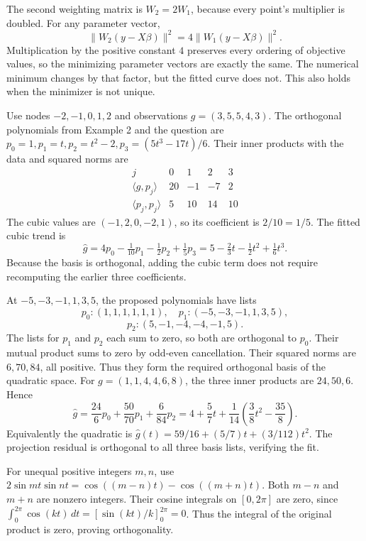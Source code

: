 The second weighting matrix is $W_2=2W_1$, because every point's
multiplier is doubled. For any parameter vector,
\[
 \|W_2(y-X\beta)\|^2=4\|W_1(y-X\beta)\|^2.
\]
Multiplication by the positive constant $4$ preserves every ordering
of objective values, so the minimizing parameter vectors are exactly
the same. The numerical minimum changes by that factor, but the
fitted curve does not. This also holds when the minimizer is not unique.

Use nodes $-2,-1,0,1,2$ and observations $g=(3,5,5,4,3)$.
The orthogonal polynomials from Example 2 and the question are
$p_0=1,p_1=t,p_2=t^2-2,p_3=(5t^3-17t)/6$.
Their inner products with the data and squared norms are
\[
\begin{array}{c|rrrr}
 j&0&1&2&3\\\hline
 \langle g,p_j\rangle&20&-1&-7&2\\
 \langle p_j,p_j\rangle&5&10&14&10
\end{array}
\]
The cubic values are $(-1,2,0,-2,1)$, so its coefficient is
$2/10=1/5$. The fitted cubic trend is
\[
 \widehat g=4p_0-\tfrac1{10}p_1-\tfrac12p_2+\tfrac15p_3
 =\boxed{5-\tfrac23t-\tfrac12t^2+\tfrac16t^3}.
\]
Because the basis is orthogonal, adding the cubic term does not require
recomputing the earlier three coefficients.

At $-5,-3,-1,1,3,5$, the proposed polynomials have lists
\[
 p_0:(1,1,1,1,1,1),\quad p_1:(-5,-3,-1,1,3,5),
\]
\[
 p_2:(5,-1,-4,-4,-1,5).
\]
The lists for $p_1$ and $p_2$ each sum to zero, so both are
orthogonal to $p_0$. Their mutual product sums to zero by odd-even
cancellation. Their squared norms are $6,70,84$, all positive.
Thus they form the required orthogonal basis of the quadratic space.
For $g=(1,1,4,4,6,8)$, the three inner products are $24,50,6$.
Hence
\[
 \widehat g=\frac{24}{6}p_0+\frac{50}{70}p_1+\frac6{84}p_2
 =4+\frac57t+\frac1{14}\left(\frac38t^2-\frac{35}{8}\right).
\]
Equivalently the quadratic is
$\boxed{\widehat g(t)=59/16+(5/7)t+(3/112)t^2}$.
The projection residual is orthogonal to all three basis lists, verifying the fit.

For unequal positive integers $m,n$, use
$2\sin mt\sin nt=\cos((m-n)t)-\cos((m+n)t)$.
Both $m-n$ and $m+n$ are nonzero integers. Their cosine integrals
on $[0,2\pi]$ are zero, since
$\int_0^{2\pi}\cos(kt)\,dt=[\sin(kt)/k]_0^{2\pi}=0$.
Thus the integral of the original product is zero, proving orthogonality.

